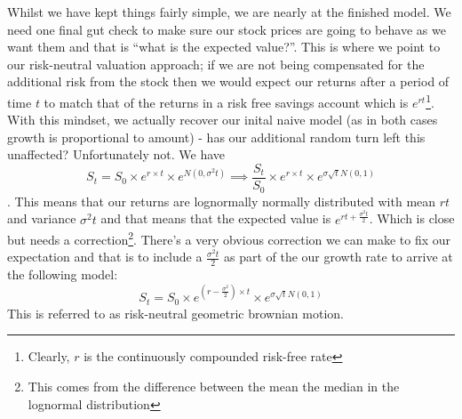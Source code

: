 \documentclass[../../Axiomathic.tex]{subfiles}
\begin{document}
Whilst we have kept things fairly simple, we are nearly at the finished model. We need one final gut check to make sure our stock prices are going to behave as we want them and that is ``what is the expected value?''. This is where we point to our risk-neutral valuation approach; if we are not being compensated for the additional risk from the stock then we would expect our returns after a period of time $t$ to match that of the returns in a risk free savings account which is $e^{rt}$\footnote{Clearly, $r$ is the continuously compounded risk-free rate}. With this mindset, we actually recover our inital naive model (as in both cases growth is proportional to amount) - has our additional random turn left this unaffected? Unfortunately not. We have \[S_t=S_0\times e^{r \times t} \times e^{N(0,\sigma^2 t)} \implies \frac{S_t}{S_0} \times e^{r \times t} \times e^{\sigma \sqrt t N(0,1)}\]. This means that our returns are lognormally normally distributed with mean $rt$ and variance $\sigma^2t$ and that means that the expected value is $e^{rt+\frac{\sigma^2t}{2}}$. Which is close but needs a correction\footnote{This comes from the difference between the mean the median in the lognormal distribution}. There's a very obvious correction we can make to fix our expectation and that is to include a $\frac{\sigma^2t}{2}$ as part of the our growth rate to arrive at the following model: \[S_t=S_0\times e^{(r-\frac{\sigma^2}{2}) \times t} \times e^{\sigma \sqrt t N(0,1)} \] This is referred to as risk-neutral geometric brownian motion.
\end{document}
